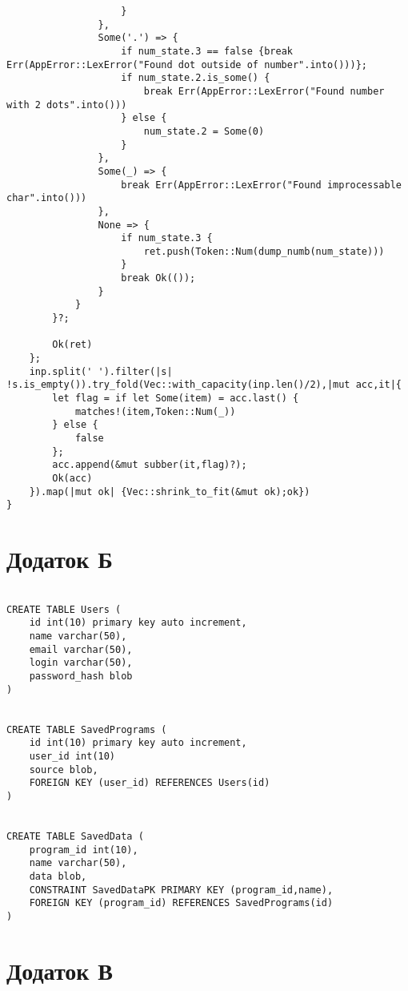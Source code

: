\begin{verbatim}
                    }
                },
                Some('.') => {
                    if num_state.3 == false {break Err(AppError::LexError("Found dot outside of number".into()))};
                    if num_state.2.is_some() {
                        break Err(AppError::LexError("Found number with 2 dots".into()))
                    } else {
                        num_state.2 = Some(0)
                    }
                },
                Some(_) => {
                    break Err(AppError::LexError("Found improcessable char".into()))
                },
                None => {
                    if num_state.3 {
                        ret.push(Token::Num(dump_numb(num_state)))
                    }
                    break Ok(());
                }
            }
        }?;

        Ok(ret)
    };
    inp.split(' ').filter(|s| !s.is_empty()).try_fold(Vec::with_capacity(inp.len()/2),|mut acc,it|{
        let flag = if let Some(item) = acc.last() {
            matches!(item,Token::Num(_))
        } else {
            false
        };
        acc.append(&mut subber(it,flag)?);
        Ok(acc)
    }).map(|mut ok| {Vec::shrink_to_fit(&mut ok);ok})
}

\end{verbatim}

\newpage
\section{Додаток Б}

\begin{verbatim}

CREATE TABLE Users (
	id int(10) primary key auto increment,
	name varchar(50),
	email varchar(50),
	login varchar(50),
	password_hash blob
)


CREATE TABLE SavedPrograms (
	id int(10) primary key auto increment,
	user_id int(10)
	source blob,
	FOREIGN KEY (user_id) REFERENCES Users(id)
)


CREATE TABLE SavedData (
	program_id int(10),
	name varchar(50),
	data blob,
	CONSTRAINT SavedDataPK PRIMARY KEY (program_id,name),
	FOREIGN KEY (program_id) REFERENCES SavedPrograms(id)
)

\end{verbatim}

\newpage
\section{Додаток В}

